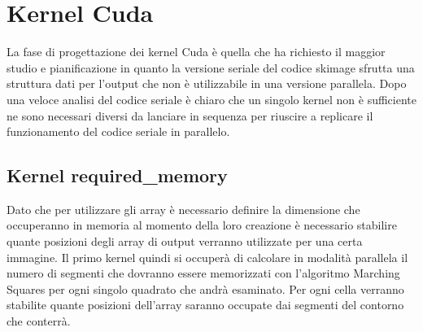 \documentclass[12pt,a4paper]{report}
\begin{document}
\section{Kernel Cuda}
La fase di progettazione dei kernel Cuda è quella che ha richiesto il maggior studio e pianificazione in quanto la versione seriale del codice skimage sfrutta una struttura dati per l'output che non è utilizzabile in una versione parallela. \newline
Dopo una veloce analisi del codice seriale è chiaro che un singolo kernel non è sufficiente ne sono necessari diversi da lanciare in sequenza per riuscire a replicare il funzionamento del codice seriale in parallelo. 
\subsection{Kernel required\_memory}
Dato che per utilizzare gli array è necessario definire la dimensione che occuperanno in memoria al momento della loro creazione è necessario stabilire quante posizioni degli array di output verranno utilizzate per una certa immagine. \newline 
Il primo kernel quindi si occuperà di calcolare in modalità parallela il numero di segmenti che dovranno essere memorizzati con l'algoritmo Marching Squares per ogni singolo quadrato che andrà esaminato.
Per ogni cella verranno stabilite quante posizioni dell'array saranno occupate dai segmenti del contorno che conterrà. \\[10pt]
\end{document}
